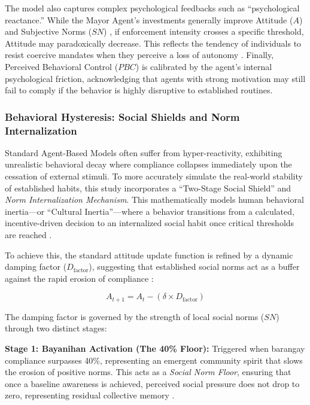 The model also captures complex psychological feedbacks such as ``psychological reactance.'' While the Mayor Agent's investments generally improve Attitude ($A$) and Subjective Norms ($SN$) \citep{Trushna2024}, if enforcement intensity crosses a specific threshold, Attitude may paradoxically decrease. This reflects the tendency of individuals to resist coercive mandates when they perceive a loss of autonomy \citep{LoanBalanay2023}. Finally, Perceived Behavioral Control ($PBC$) is calibrated by the agent's internal psychological friction, acknowledging that agents with strong motivation may still fail to comply if the behavior is highly disruptive to established routines.

\subsubsection{Behavioral Hysteresis: Social Shields and Norm Internalization}

Standard Agent-Based Models often suffer from hyper-reactivity, exhibiting unrealistic behavioral decay where compliance collapses immediately upon the cessation of external stimuli. To more accurately simulate the real-world stability of established habits, this study incorporates a ``Two-Stage Social Shield'' and \textit{Norm Internalization Mechanism}. This mathematically models human behavioral inertia—or ``Cultural Inertia''—where a behavior transitions from a calculated, incentive-driven decision to an internalized social habit once critical thresholds are reached \citep{Ceschi2021, Corcoran2020}.

To achieve this, the standard attitude update function is refined by a dynamic damping factor ($D_{\mathrm{factor}}$), suggesting that established social norms act as a buffer against the rapid erosion of compliance \citep{Andre2021}:

\begin{equation}
    A_{t+1} = A_t - (\delta \times D_{\mathrm{factor}})
\end{equation}

The damping factor is governed by the strength of local social norms ($SN$) through two distinct stages:

\textbf{Stage 1: Bayanihan Activation (The 40\% Floor):} Triggered when barangay compliance surpasses 40\%, representing an emergent community spirit that slows the erosion of positive norms. This acts as a \textit{Social Norm Floor}, ensuring that once a baseline awareness is achieved, perceived social pressure does not drop to zero, representing residual collective memory \citep{Nishimura2022}.

